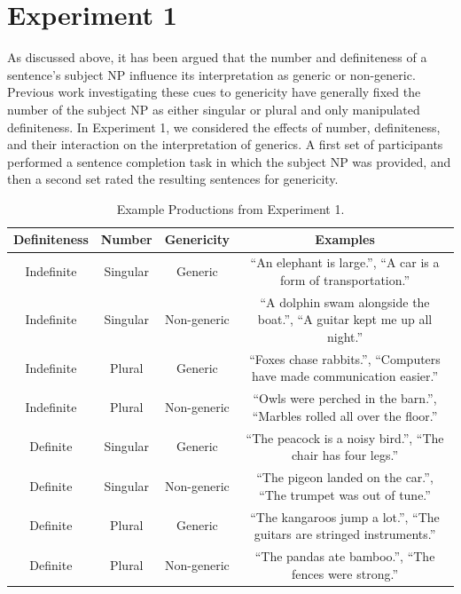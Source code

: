 \documentclass[10pt,letterpaper]{article}
\begin{document}
\section{Experiment 1}

As discussed above, it has been argued that the number and definiteness of a sentence's subject NP influence its interpretation as generic or non-generic. Previous work investigating these cues to genericity have generally fixed the number of the subject NP as either singular \cite{Cimpian:2011} or plural \cite{Gelman:2003} and only manipulated definiteness. In Experiment 1, we considered the effects of number, definiteness, and their interaction on the interpretation of generics. A first set of participants performed a sentence completion task in which the subject NP was provided, and then a second set rated the resulting sentences for genericity.

\begin{table}
\begin{center}
\caption{Example Productions from Experiment 1.}
\label{tab:ex}
\vskip 0.12in
\begin{tabular}{cccc}
\hline
Definiteness    &  Number & Genericity & Examples \\
\hline
Indefinite        &   Singular & Generic & ``An elephant is large.'', ``A car is a form of transportation.''\\
Indefinite  &   Singular & Non-generic & ``A dolphin swam alongside the boat.'', ``A guitar kept me up all night.''\\
Indefinite           &   Plural & Generic & ``Foxes chase rabbits.'', ``Computers have made communication easier.''\\
Indefinite         &   Plural  & Non-generic & ``Owls were perched in the barn.'', ``Marbles rolled all over the floor.''\\
Definite        &   Singular & Generic & ``The peacock is a noisy bird.'', ``The chair has four legs.''  \\
Definite  &   Singular & Non-generic & ``The pigeon landed on the car.'', ``The trumpet was out of tune.''\\
Definite           &   Plural & Generic & ``The kangaroos jump a lot.'', ``The guitars are stringed instruments.'' \\
Definite         &   Plural & Non-generic & ``The pandas ate bamboo.'', ``The fences were strong.''\\
\hline
\end{tabular}
\end{center}
\end{table}
\end{document}
